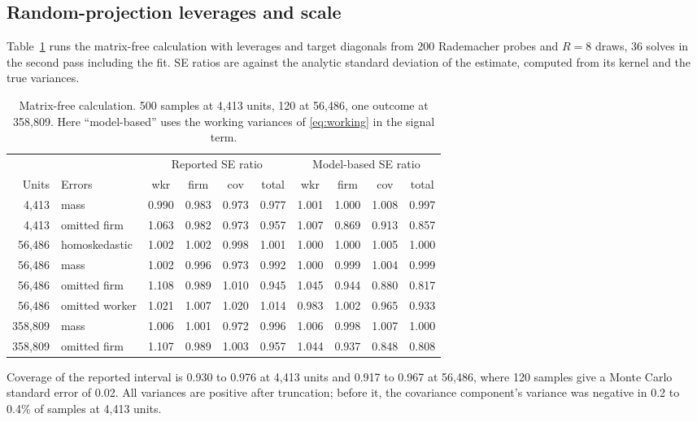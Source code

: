 \documentclass[11pt]{article}
\begin{document}
\subsection{Random-projection leverages and scale}

Table~\ref{tab:scale} runs the matrix-free calculation with leverages and
target diagonals from 200 Rademacher probes and $R=8$ draws, 36 solves in the
second pass including the fit. SE ratios are against the analytic standard
deviation of the estimate, computed from its kernel and the true variances.

\begin{table}[ht]
\centering\small
\begin{tabular}{@{}rlcccc@{\hskip 1.2em}cccc@{}}
\toprule
 & & \multicolumn{4}{c}{Reported SE ratio} & \multicolumn{4}{c}{Model-based SE ratio} \\
Units & Errors & wkr & firm & cov & total & wkr & firm & cov & total \\
\midrule
4,413 & mass & 0.990 & 0.983 & 0.973 & 0.977 & 1.001 & 1.000 & 1.008 & 0.997 \\
4,413 & omitted firm & 1.063 & 0.982 & 0.973 & 0.957 & 1.007 & 0.869 & 0.913 & 0.857 \\
56,486 & homoskedastic & 1.002 & 1.002 & 0.998 & 1.001 & 1.000 & 1.000 & 1.005 & 1.000 \\
56,486 & mass & 1.002 & 0.996 & 0.973 & 0.992 & 1.000 & 0.999 & 1.004 & 0.999 \\
56,486 & omitted firm & 1.108 & 0.989 & 1.010 & 0.945 & 1.045 & 0.944 & 0.880 & 0.817 \\
56,486 & omitted worker & 1.021 & 1.007 & 1.020 & 1.014 & 0.983 & 1.002 & 0.965 & 0.933 \\
358,809 & mass & 1.006 & 1.001 & 0.972 & 0.996 & 1.006 & 0.998 & 1.007 & 1.000 \\
358,809 & omitted firm & 1.107 & 0.989 & 1.003 & 0.957 & 1.044 & 0.937 & 0.848 & 0.808 \\
\bottomrule
\end{tabular}
\caption{Matrix-free calculation. 500 samples at 4,413 units, 120 at 56,486,
one outcome at 358,809. Here ``model-based'' uses the working variances of
\eqref{eq:working} in the signal term.}\label{tab:scale}
\end{table}

Coverage of the reported interval is 0.930 to 0.976 at 4,413 units and 0.917
to 0.967 at 56,486, where 120 samples give a Monte Carlo standard error of
0.02. All variances are positive after truncation; before it, the covariance
component's variance was negative in 0.2 to 0.4\% of samples at 4,413 units.
\end{document}
